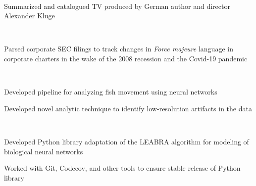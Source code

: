 \documentclass[a4paper]{MagicalCV}
\begin{document}
\begin{minipage}[t]{0.66\textwidth} 


 \\
\vspace{\topsep} %
\begin{tightemize}
\item Summarized and catalogued TV produced by German author and director Alexander Kluge
\end{tightemize}
\sectionsep

 \\
\vspace{\topsep} %
\begin{tightemize}
\item Parsed corporate SEC filings to track changes in \textit{Force majeure} language in corporate charters in the wake of the 2008 recession and the Covid-19 pandemic
\end{tightemize}
\sectionsep

 \\
\vspace{\topsep} %
\begin{tightemize}
\item Developed pipeline for analyzing fish movement using neural networks
\item Developed novel analytic technique to identify low-resolution artifacts in the data
\end{tightemize}
\sectionsep

 \\
\vspace{\topsep} %
\begin{tightemize}
\item Developed Python library adaptation of the LEABRA algorithm for modeling of biological neural networks
\item Worked with Git, Codecov, and other tools to ensure stable release of Python library
\end{tightemize}
\sectionsep


\end{minipage}
\end{document}
